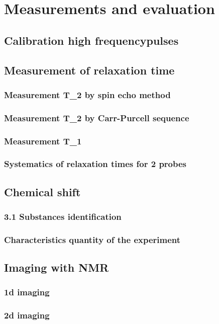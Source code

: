 \section{Measurements and evaluation}\label{measurements-and-evaluation}

\subsection{Calibration high frequencypulses}\label{calibration-high-frequency-pulses}

\subsection{Measurement of relaxation time}\label{relaxation-time}

\subsubsection{Measurement T\_2 by spin echo method}\label{t_2-by-spin}

\subsubsection{Measurement T\_2 by Carr-Purcell sequence}\label{t_2-carr}

\subsubsection{Measurement T\_1}\label{measurement-t_1}

\subsubsection{Systematics of relaxation times for 2 probes}\label{2-probes}

\subsection{Chemical shift}\label{chemical-shift}

\subsubsection{3.1 Substances identification}\label{substances-identification}

\subsubsection{Characteristics quantity of the experiment}\label{characteristics}

\subsection{Imaging with NMR}\label{imaging-with-nmr}

\subsubsection{1d imaging}\label{d-imaging}

\subsubsection{2d imaging}\label{d-imaging-1}